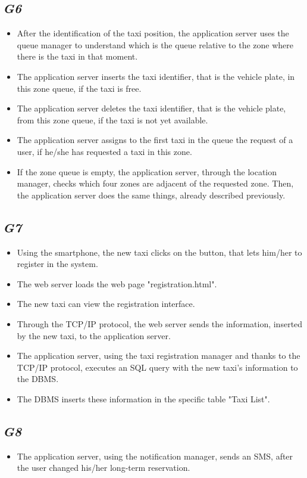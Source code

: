 	\subsection {\emph{G6}}
		\begin{itemize}
			\item After the identification of the taxi position, the application server uses the queue manager to understand which is the queue relative to the zone where there is the taxi in that moment.
			\item The application server inserts the taxi identifier, that is the vehicle plate, in this zone queue, if the taxi is free.
			\item The application server deletes the taxi identifier, that is the vehicle plate, from this zone queue, if the taxi is not yet available.
			\item The application server assigns to the first taxi in the queue the request of a user, if he/she has requested a taxi in this zone.
			\item If the zone queue is empty, the application server, through the location manager, checks which four zones are adjacent of the requested zone. Then, the application server does the same things, already described previously.
		\end{itemize}
	\subsection {\emph{G7}}
		\begin{itemize}
			\item Using the smartphone, the new taxi clicks on the button, that lets him/her to register in the system.
			\item The web server loads the web page "registration.html".
			\item The new taxi can view the registration interface.
			\item Through the TCP/IP protocol, the web server sends the information, inserted by the new taxi, to the application server.
			\item The application server, using the taxi registration manager and thanks to the TCP/IP protocol, executes an SQL query with the new taxi's information to the DBMS.
			\item The DBMS inserts these information in the specific table "Taxi List".
		\end{itemize}
	\subsection {\emph{G8}}
		\begin{itemize}
			\item The application server, using the notification manager, sends an SMS, after the user changed his/her long-term reservation.
		\end{itemize}
